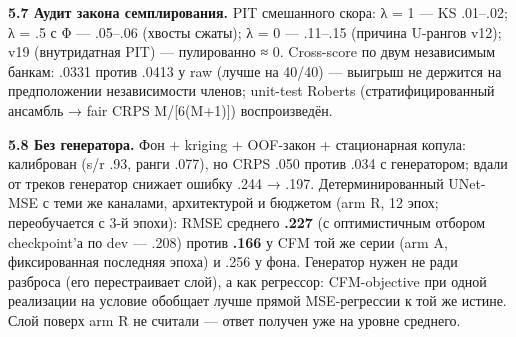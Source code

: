 \documentclass[11pt]{article}
\begin{document}
\textbf{5.7 Аудит закона семплирования.} PIT смешанного скора: {\symfont λ} = 1 — KS .01–.02; {\symfont λ} = .5 с {\symfont Φ} — .05–.06 (хвосты сжаты); {\symfont λ} = 0 — .11–.15 (причина U-рангов v12); v19 (внутридатная PIT) — пулированно {\symfont ≈} 0. Cross-score по двум независимым банкам: .0331 против .0413 у raw (лучше на 40/40) — выигрыш не держится на предположении независимости членов; unit-test Roberts (стратифицированный ансамбль {\symfont →} fair CRPS M/[6(M+1)]) воспроизведён.

\textbf{5.8 Без генератора.} Фон + kriging + OOF-закон + стационарная копула: калиброван (s/r .93, ранги .077), но CRPS .050 против .034 с генератором; вдали от треков генератор снижает ошибку .244 {\symfont →} .197. Детерминированный UNet-MSE с теми же каналами, архитектурой и бюджетом (arm R, 12 эпох; переобучается с 3-й эпохи): RMSE среднего \textbf{.227} (с оптимистичным отбором checkpoint'а по dev — .208) против \textbf{.166} у CFM той же серии (arm A, фиксированная последняя эпоха) и .256 у фона. Генератор нужен не ради разброса (его перестраивает слой), а как регрессор: CFM-objective при одной реализации на условие обобщает лучше прямой MSE-регрессии к той же истине. Слой поверх arm R не считали — ответ получен уже на уровне среднего.
\end{document}
